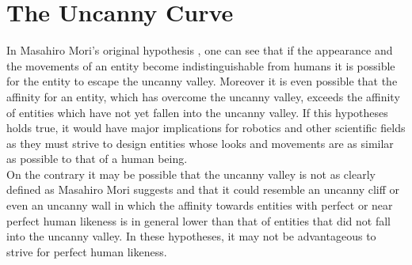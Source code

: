 \chapter{The Uncanny Curve}
In Masahiro Mori's original hypothesis \cite{original_masahiro}, one can see that if the appearance and the movements of an entity become indistinguishable from humans it is possible for the entity to escape the uncanny valley. Moreover it is even possible that the affinity for an entity, which has overcome the uncanny valley, exceeds the affinity of entities which have not yet fallen into the uncanny valley. If this hypotheses holds true, it would have major implications for robotics and other scientific fields as they must strive to design entities whose looks and movements are as similar as possible to that of a human being.\\
On the contrary it may be possible that the uncanny valley  is not as clearly defined as Masahiro Mori suggests and that it could resemble an uncanny cliff or even an uncanny wall in which the affinity towards entities with perfect or near perfect human likeness is in general lower than that of entities that did not fall into the uncanny valley. In these hypotheses, it may not be advantageous to strive for perfect human likeness.

